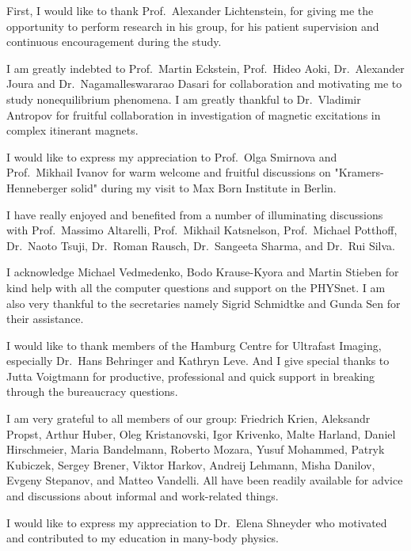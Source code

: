 \documentclass[
12pt, %
english, %
singlespacing, %
liststotoc, %
headsepline, %
]{MastersDoctoralThesis} %
\numberwithin{equation}{section}
\begin{document}
\begin{acknowledgments}
\addchaptertocentry{\acknowledgmentname} %
    \vspace{1cm}
First, I would like to thank Prof.~Alexander Lichtenstein, for giving me the opportunity to perform research in his group, for his patient supervision and continuous encouragement during the study.

I am greatly indebted to Prof.~Martin Eckstein, Prof.~Hideo Aoki, Dr.~Alexander Joura and Dr.~Nagamalleswararao Dasari for collaboration and motivating me to study nonequilibrium phenomena. I am greatly thankful to Dr.~Vladimir Antropov for
fruitful collaboration in investigation of magnetic excitations in complex itinerant magnets. 

I would like to express my appreciation to Prof.~Olga Smirnova and Prof.~Mikhail Ivanov for warm welcome and fruitful discussions on "Kramers-Henneberger solid" during my visit to Max Born Institute in Berlin.

I have really enjoyed and benefited from a number of illuminating discussions with Prof.~Massimo Altarelli, Prof.~Mikhail Katsnelson, Prof.~Michael Potthoff, Dr.~Naoto Tsuji, Dr.~Roman Rausch, Dr.~Sangeeta Sharma, and Dr.~Rui Silva.

I acknowledge Michael Vedmedenko, Bodo Krause-Kyora and Martin Stieben for kind help with all the computer questions and support on the PHYSnet.
I am also very thankful to the secretaries namely Sigrid Schmidtke and Gunda Sen for their assistance. 

I would like to thank members of the Hamburg Centre for Ultrafast Imaging, especially Dr.~Hans Behringer and  Kathryn Leve. And I give special thanks to Jutta Voigtmann for productive, professional and quick support in breaking through the bureaucracy questions.

I am very grateful to all members of our group:
Friedrich Krien, Aleksandr Propst, Arthur Huber, Oleg Kristanovski, Igor Krivenko, Malte Harland, Daniel Hirschmeier, Maria Bandelmann, Roberto Mozara, Yusuf Mohammed, Patryk Kubiczek, Sergey Brener, Viktor Harkov, Andreij Lehmann, Misha Danilov, Evgeny Stepanov, and Matteo Vandelli. All have been readily available for advice and discussions about informal and work-related things.

I would like to express my appreciation to Dr.~Elena Shneyder who motivated and contributed to my education in many-body physics.


\end{acknowledgments}
\end{document}
